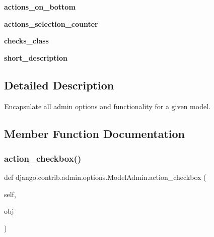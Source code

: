 \begin{DoxyCompactItemize}
{\bfseries actions\+\_\+on\+\_\+bottom}
\item 
\mbox{\label{classdjango_1_1contrib_1_1admin_1_1options_1_1_model_admin_a224cc07cdd6ff2427b29c66be26727a1}} 
{\bfseries actions\+\_\+selection\+\_\+counter}
\item 
\mbox{\label{classdjango_1_1contrib_1_1admin_1_1options_1_1_model_admin_a3c80a93a31601e2a7f1d65af7f33cdce}} 
{\bfseries checks\+\_\+class}
\item 
\mbox{\label{classdjango_1_1contrib_1_1admin_1_1options_1_1_model_admin_acc18c4bf4e37490514fd37039565470e}} 
{\bfseries short\+\_\+description}
\end{DoxyCompactItemize}


\subsection{Detailed Description}
\begin{DoxyVerb}Encapsulate all admin options and functionality for a given model.\end{DoxyVerb}
 

\subsection{Member Function Documentation}
\mbox{\label{classdjango_1_1contrib_1_1admin_1_1options_1_1_model_admin_ab0751cb5959093c89944108d5ff89766}} 
\subsubsection{\texorpdfstring{action\+\_\+checkbox()}{action\_checkbox()}}
{\footnotesize\ttfamily def django.\+contrib.\+admin.\+options.\+Model\+Admin.\+action\+\_\+checkbox (\begin{DoxyParamCaption}\item[{}]{self,  }\item[{}]{obj }\end{DoxyParamCaption})}

